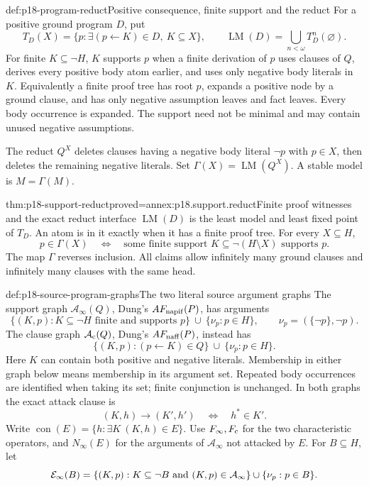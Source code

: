 \begin{hbdefinition}{def:p18-program-reduct}{Positive consequence, finite support and the reduct}
For a positive ground program \(D\), put
\[
 T_D(X)=\{p:\exists(p\leftarrow K)\in D,\ K\subseteq X\},
 \qquad \operatorname{LM}(D)=\bigcup_{n<\omega}T_D^n(\varnothing).
\]
For finite \(K\subseteq\neg H\), \(K\) supports \(p\)
when a finite derivation of \(p\) uses clauses of \(Q\),
derives every positive body atom earlier, and uses only
negative body literals in \(K\). Equivalently a finite
proof tree has root \(p\), expands a positive node by
a ground clause, and has only negative assumption leaves
and fact leaves. Every body occurrence is expanded.
The support need not be minimal and may contain unused
negative assumptions.

The reduct \(Q^X\) deletes clauses having a negative
body literal \(\neg p\) with \(p\in X\), then deletes
the remaining negative literals. Set
\(\Gamma(X)=\operatorname{LM}(Q^X)\).
A stable model is \(M=\Gamma(M)\).
\end{hbdefinition}

\begin{hblemma}{thm:p18-support-reduct}{proved=annex:p18.support.reduct}{Finite proof witnesses and the exact reduct interface}
\(\operatorname{LM}(D)\) is the least model and least
fixed point of \(T_D\). An atom is in it exactly when
it has a finite proof tree. For every \(X\subseteq H\),
\[
 p\in\Gamma(X)\quad\Longleftrightarrow\quad
 \text{some finite support }K\subseteq\neg(H\setminus X)
                                      \text{ supports }p.
\]
The map \(\Gamma\) reverses inclusion. All claims allow
infinitely many ground clauses and infinitely many
clauses with the same head.
\end{hblemma}

\begin{hbdefinition}{def:p18-source-program-graphs}{The two literal source argument graphs}
The support graph \(\mathcal A_\infty(Q)\), Dung's
\(AF_{\rm napif}(P)\), has arguments
\[
 \{(K,p):K\subseteq\neg H\text{ finite and supports }p\}
       \ \cup\ \{\nu_p:p\in H\},\qquad
                        \nu_p=(\{\neg p\},\neg p).
\]
The clause graph \(\mathcal A_{\rm c}(Q)\), Dung's
\(AF_{\rm naff}(P)\), instead has
\[
 \{(K,p):(p\leftarrow K)\in Q\}\ \cup\ \{\nu_p:p\in H\}.
\]
Here \(K\) can contain both positive and negative literals.
Membership in either graph below means membership
in its argument set.
Repeated body occurrences are identified when taking its
set; finite conjunction is unchanged.
In both graphs the exact attack clause is
\[
                  (K,h)\to(K',h')\quad\Longleftrightarrow\quad h^*\in K'.
\]
Write \(\operatorname{con}(E)=\{h:\exists K\ (K,h)\in E\}\).
Use \(F_\infty,F_{\rm c}\) for the two characteristic
operators, and \(N_\infty(E)\) for the arguments of
\(\mathcal A_\infty\) not attacked by \(E\).
For \(B\subseteq H\), let
\[
 {\cal E}_\infty(B)=
   \{(K,p):K\subseteq\neg B\text{ and }(K,p)\in\mathcal A_\infty\}
                    \cup\{\nu_p:p\in B\}.
\]
\end{hbdefinition}

